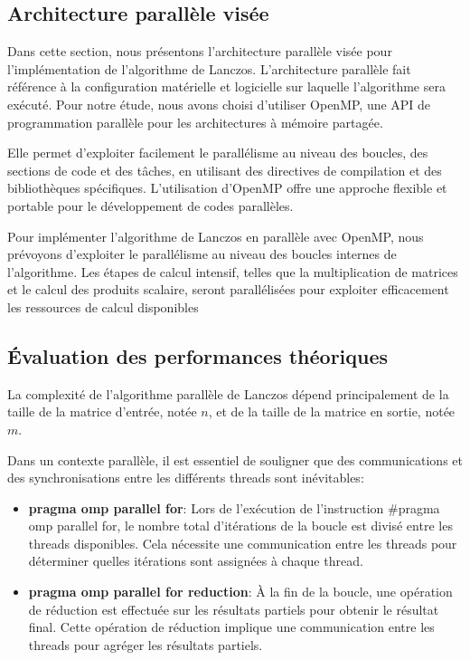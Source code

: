 \documentclass[11pt,french]{article}
\begin{document}
    \subsection{Architecture parallèle visée}
    Dans cette section, nous présentons l'architecture parallèle visée pour l'implémentation de l'algorithme de Lanczos. L'architecture parallèle fait référence à la configuration matérielle et logicielle sur laquelle l'algorithme sera exécuté. Pour notre étude, nous avons choisi d'utiliser OpenMP, une API de programmation parallèle pour les architectures à mémoire partagée.
    
    Elle permet d'exploiter facilement le parallélisme au niveau des boucles, des sections de code et des tâches, en utilisant des directives de compilation et des bibliothèques spécifiques. L'utilisation d'OpenMP offre une approche flexible et portable pour le développement de codes parallèles.
    
    Pour implémenter l'algorithme de Lanczos en parallèle avec OpenMP, nous prévoyons d'exploiter le parallélisme au niveau des boucles internes de l'algorithme. Les étapes de calcul intensif, telles que la multiplication de matrices et le calcul des produits scalaire, seront parallélisées pour exploiter efficacement les ressources de calcul disponibles
    
	\subsection{Évaluation des performances théoriques}
	La complexité de l'algorithme parallèle de Lanczos dépend principalement de la taille de la matrice d'entrée, notée $n$, et de la taille de la matrice en sortie, notée $m$.

    Dans un contexte parallèle, il est essentiel de souligner que des communications et des synchronisations entre les différents threads sont inévitables:
    \begin{itemize}
    \item \textbf{pragma omp parallel for}:  Lors de l'exécution de l'instruction #pragma omp parallel for, le nombre total d'itérations de la boucle est divisé entre les threads disponibles. Cela nécessite une communication entre les threads pour déterminer quelles itérations sont assignées à chaque thread.
    
    \item \textbf{pragma omp parallel for reduction}:  À la fin de la boucle, une opération de réduction est effectuée sur les résultats partiels pour obtenir le résultat final. Cette opération de réduction implique une communication entre les threads pour agréger les résultats partiels.
	\end{itemize}
\end{document}
